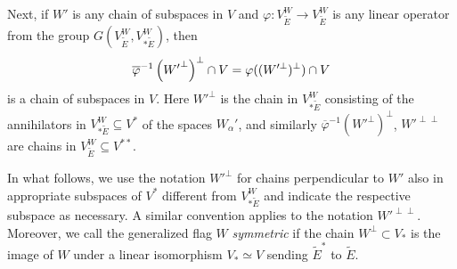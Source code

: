 \documentclass[11pt, a4paper]{article}
\begin{document}
Next, if $W'$ is any chain of subspaces in $V$ and $\varphi\colon V^W_{\widetilde{E}}\rightarrow V^W_{\widetilde{E}}$ is any linear operator from the group $ G(V^W_{\widetilde{E}},V^W_{*\widetilde{E}})$, then \begin{equation}\label{formula:action_on_flag}
	\overline{\varphi}^{-1}\left({W'}^\perp\right)^{\perp}\cap V=\varphi((W'^{\perp})^{\perp})\cap V
\end{equation}
is a chain of subspaces in $V$. Here $W'^{\perp}$ is the chain in $V^W_{*\widetilde{E}}$ consisting of the annihilators in $V^W_{*\widetilde{E}}\subseteq V^*$ of the spaces $W_{\alpha}'$, and similarly $\overline{\varphi}^{-1}\left(W'^\perp\right)^{\perp}$, $W'^{\perp\perp}$ are chains in $V^W_{\widetilde{E}}\subseteq V^{**}$. 

In what follows, we use the notation ${W'}^{\perp}$ for chains perpendicular to $W'$ also in appropriate subspaces of $V^*$ different from $V^W_{*\widetilde{E}}$ and indicate the respective subspace as necessary. A similar convention applies to the notation ${W'}^{\perp \perp}$. Moreover, we call the generalized flag $W$ \emph{symmetric} if the chain $W^{\perp}\subset V_*$ is the image of $W$ under a linear isomorphism $V_*\simeq V$ sending $\widetilde{E}^*$ to $\widetilde{E}$.



\end{document}
